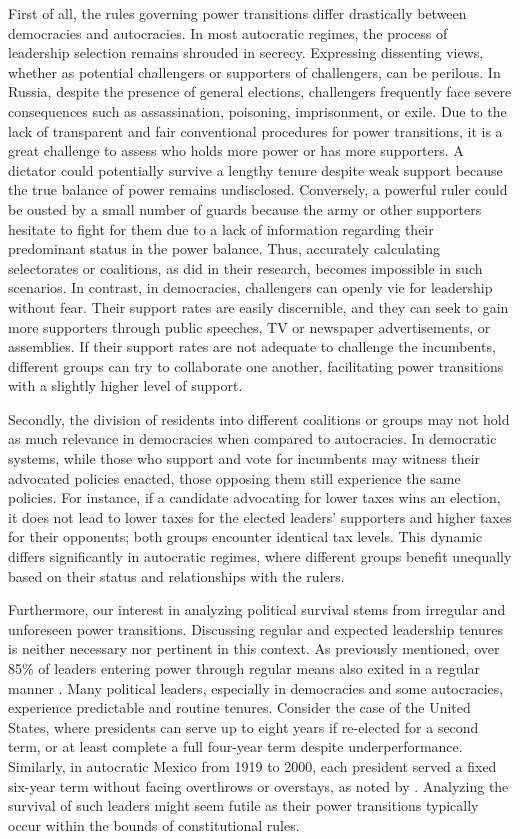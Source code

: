 \documentclass[
  12pt,
  a4paper,
  12pt]{article}
\begin{document}
First of all, the rules governing power transitions differ drastically
between democracies and autocracies. In most autocratic regimes, the
process of leadership selection remains shrouded in secrecy. Expressing
dissenting views, whether as potential challengers or supporters of
challengers, can be perilous. In Russia, despite the presence of general
elections, challengers frequently face severe consequences such as
assassination, poisoning, imprisonment, or exile. Due to the lack of
transparent and fair conventional procedures for power transitions, it
is a great challenge to assess who holds more power or has more
supporters. A dictator could potentially survive a lengthy tenure
despite weak support because the true balance of power remains
undisclosed. Conversely, a powerful ruler could be ousted by a small
number of guards because the army or other supporters hesitate to fight
for them due to a lack of information regarding their predominant status
in the power balance. Thus, accurately calculating selectorates or
coalitions, as \citet{buenodemesquita2003} did in their research,
becomes impossible in such scenarios. In contrast, in democracies,
challengers can openly vie for leadership without fear. Their support
rates are easily discernible, and they can seek to gain more supporters
through public speeches, TV or newspaper advertisements, or assemblies.
If their support rates are not adequate to challenge the incumbents,
different groups can try to collaborate one another, facilitating power
transitions with a slightly higher level of support.

Secondly, the division of residents into different coalitions or groups
may not hold as much relevance in democracies when compared to
autocracies. In democratic systems, while those who support and vote for
incumbents may witness their advocated policies enacted, those opposing
them still experience the same policies. For instance, if a candidate
advocating for lower taxes wins an election, it does not lead to lower
taxes for the elected leaders' supporters and higher taxes for their
opponents; both groups encounter identical tax levels. This dynamic
differs significantly in autocratic regimes, where different groups
benefit unequally based on their status and relationships with the
rulers.

Furthermore, our interest in analyzing political survival stems from
irregular and unforeseen power transitions. Discussing regular and
expected leadership tenures is neither necessary nor pertinent in this
context. As previously mentioned, over 85\% of leaders entering power
through regular means also exited in a regular manner
\citep{goemans2009}. Many political leaders, especially in democracies
and some autocracies, experience predictable and routine tenures.
Consider the case of the United States, where presidents can serve up to
eight years if re-elected for a second term, or at least complete a full
four-year term despite underperformance. Similarly, in autocratic Mexico
from 1919 to 2000, each president served a fixed six-year term without
facing overthrows or overstays, as noted by \citep{klesner2019}.
Analyzing the survival of such leaders might seem futile as their power
transitions typically occur within the bounds of constitutional rules.
\end{document}
